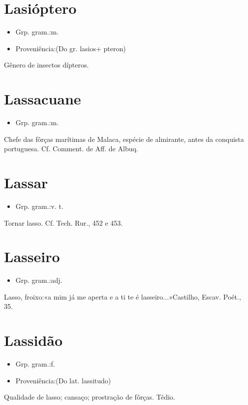 \section{Lasióptero}
\begin{itemize}
\item {Grp. gram.:m.}
\end{itemize}
\begin{itemize}
\item {Proveniência:(Do gr. \textunderscore lasios\textunderscore  + \textunderscore pteron\textunderscore )}
\end{itemize}
Gênero de insectos dípteros.
\section{Lassacuane}
\begin{itemize}
\item {Grp. gram.:m.}
\end{itemize}
Chefe das fôrças marítimas de Malaca, espécie de almirante, antes da conquista portuguesa. Cf. \textunderscore Comment. de Aff. de Albuq.\textunderscore 
\section{Lassar}
\begin{itemize}
\item {Grp. gram.:v. t.}
\end{itemize}
Tornar lasso. Cf. \textunderscore Tech. Rur.\textunderscore , 452 e 453.
\section{Lasseiro}
\begin{itemize}
\item {Grp. gram.:adj.}
\end{itemize}
Lasso, froixo:«\textunderscore a mim já me aperta e a ti te é lasseiro...\textunderscore »Castilho, \textunderscore Escav. Poét.\textunderscore , 35.
\section{Lassidão}
\begin{itemize}
\item {Grp. gram.:f.}
\end{itemize}
\begin{itemize}
\item {Proveniência:(Do lat. \textunderscore lassitudo\textunderscore )}
\end{itemize}
Qualidade de lasso; cansaço; prostração de fôrças.
Tédio.
